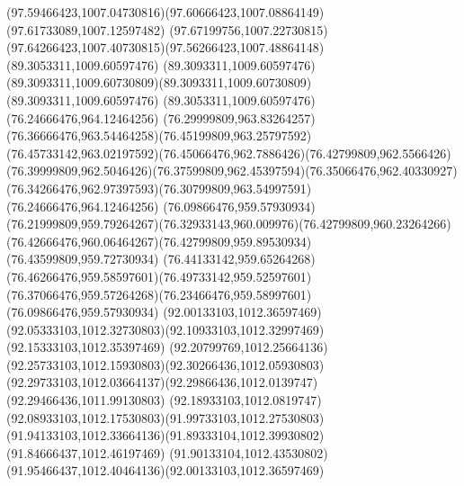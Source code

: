 {{\curveto(97.59466423,1007.04730816)(97.60666423,1007.08864149)(97.61733089,1007.12597482)
\curveto(97.67199756,1007.22730815)(97.64266423,1007.40730815)(97.56266423,1007.48864148)
\moveto(89.3053311,1009.60597476)
\curveto(89.3093311,1009.60597476)(89.3093311,1009.60730809)(89.3093311,1009.60730809)
\lineto(89.3093311,1009.60597476)
\lineto(89.3053311,1009.60597476)
\moveto(76.24666476,964.12464256)
\curveto(76.29999809,963.83264257)(76.36666476,963.54464258)(76.45199809,963.25797592)
\curveto(76.45733142,963.02197592)(76.45066476,962.7886426)(76.42799809,962.5566426)
\curveto(76.39999809,962.5046426)(76.37599809,962.45397594)(76.35066476,962.40330927)
\curveto(76.34266476,962.97397593)(76.30799809,963.54997591)(76.24666476,964.12464256)
\moveto(76.09866476,959.57930934)
\curveto(76.21999809,959.79264267)(76.32933143,960.009976)(76.42799809,960.23264266)
\curveto(76.42666476,960.06464267)(76.42799809,959.89530934)(76.43599809,959.72730934)
\curveto(76.44133142,959.65264268)(76.46266476,959.58597601)(76.49733142,959.52597601)
\curveto(76.37066476,959.57264268)(76.23466476,959.58997601)(76.09866476,959.57930934)
\moveto(92.00133103,1012.36597469)
\curveto(92.05333103,1012.32730803)(92.10933103,1012.32997469)(92.15333103,1012.35397469)
\curveto(92.20799769,1012.25664136)(92.25733103,1012.15930803)(92.30266436,1012.05930803)
\curveto(92.29733103,1012.03664137)(92.29866436,1012.0139747)(92.29466436,1011.99130803)
\curveto(92.18933103,1012.0819747)(92.08933103,1012.17530803)(91.99733103,1012.27530803)
\curveto(91.94133103,1012.33664136)(91.89333104,1012.39930802)(91.84666437,1012.46197469)
\curveto(91.90133104,1012.43530802)(91.95466437,1012.40464136)(92.00133103,1012.36597469)
}
}
